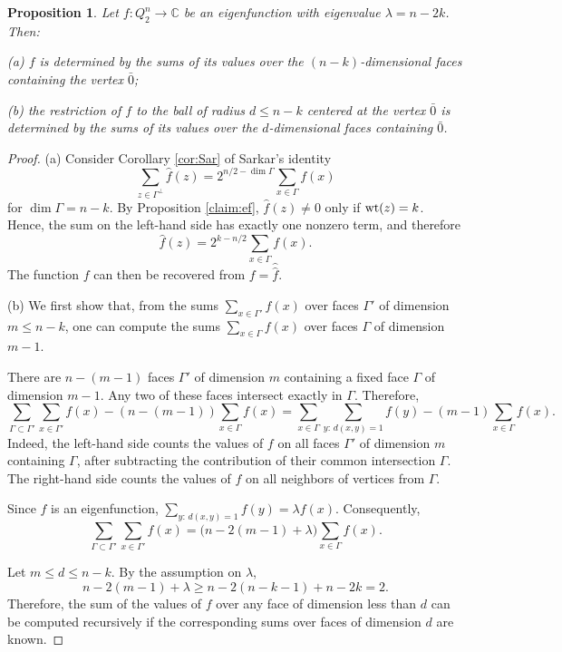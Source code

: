 \documentclass[11pt]{article}
\newtheorem{claim}{Proposition}[section]
\theoremstyle{definition}
\newcommand{\wt}{{\rm wt}}
\begin{document}
{{{\begin{claim}
Let $f:Q_2^n\rightarrow\mathbb{C}$ be an eigenfunction with
eigenvalue $\lambda=n-2k$. Then:

{\rm (a)} $f$ is determined by the sums of its values over the
$(n-k)$-dimensional faces containing the vertex $\bar 0$;

{\rm (b)}
the restriction of $f$ to the ball of radius $d\leq n-k$ centered
at the vertex $\bar 0$ is determined by the sums of its values over
the $d$-dimensional faces containing $\bar 0$.

\end{claim}

\begin{proof}

(a)  Consider Corollary \ref{cor:Sar} of Sarkar's identity
\[
\sum_{z\in\Gamma^\perp}\widehat{f}(z)
=
2^{n/2-\dim\Gamma}
\sum_{x\in\Gamma}f(x)
\]
for $\dim\Gamma=n-k$. By Proposition \ref{claim:ef},
$\widehat{f}(z)\neq0$ only if $\wt(z)=k$. Hence, the sum on the
left-hand side has exactly one nonzero term, and therefore
\[
\widehat{f}(z)
=
2^{k-n/2}\sum_{x\in\Gamma}f(x).
\]
The function $f$ can then be recovered from
$f=\widehat{\widehat{f}}$.


(b) We first show that, from the sums
$
\sum_{x\in\Gamma'}f(x)
$
over faces $\Gamma'$ of dimension $m\leq n-k$, one can compute the
sums
$
\sum_{x\in\Gamma}f(x)
$
over faces $\Gamma$ of dimension $m-1$.

There are $n-(m-1)$ faces $\Gamma'$ of dimension $m$ containing a
fixed face $\Gamma$ of dimension $m-1$. Any two of these faces
intersect exactly in $\Gamma$. Therefore,
\[
\sum_{\Gamma\subset\Gamma'}
  \sum_{x\in\Gamma'}f(x)
-(n-(m-1))\sum_{x\in\Gamma}f(x)
=
\sum_{x\in\Gamma}\sum_{y:\,d(x,y)=1}f(y)
-(m-1)\sum_{x\in\Gamma}f(x).
\]
Indeed, the left-hand side counts the values of $f$ on all faces
$\Gamma'$ of dimension $m$ containing $\Gamma$, after subtracting
the contribution of their common intersection $\Gamma$.
 The right-hand side counts the values of $f$ on all neighbors of vertices from  $\Gamma$.


Since $f$ is an eigenfunction,
$
\sum\limits_{y:\,d(x,y)=1}f(y)=\lambda f(x)$.
Consequently,
\[
\sum_{\Gamma\subset\Gamma'}
\sum_{x\in\Gamma'}f(x)
=
\bigl(n-2(m-1)+\lambda\bigr)
\sum_{x\in\Gamma}f(x).
\]

Let $m\leq d\leq n-k$. By the assumption on $\lambda$,
\[
n-2(m-1)+\lambda
\geq n-2(n-k-1)+n-2k
=2.
\]
Therefore, the sum of the values of $f$ over any face of dimension
less than $d$ can be computed recursively if the corresponding sums
over faces of dimension $d$ are known. 


\end{proof}}}}
\end{document}
